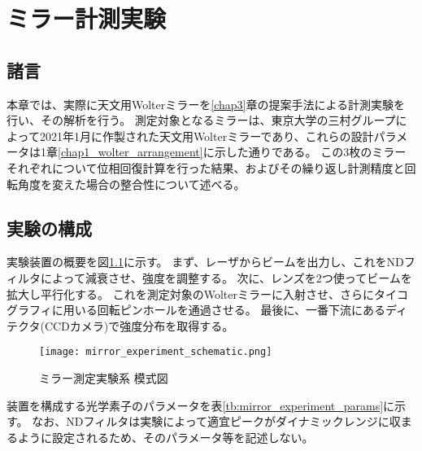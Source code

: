 \chapter{ミラー計測実験}
\thispagestyle{empty}
\label{chap5}
\graphicspath{{chap5/figure/}}
\minitoc

\newpage


\section{諸言}
\label{chap5_introduction}

本章では、実際に天文用Wolterミラーを\ref{chap3}章の提案手法による計測実験を行い、その解析を行う。
測定対象となるミラーは、東京大学の三村グループによって2021年1月に作製された天文用Wolterミラーであり、これらの設計パラメータは1章\ref{chap1_wolter_arrangement}に示した通りである。
この3枚のミラーそれぞれについて位相回復計算を行った結果、およびその繰り返し計測精度と回転角度を変えた場合の整合性について述べる。

\clearpage
\newpage

\section{実験の構成}

実験装置の概要を図\ref{fig:mirror_experiment_schematic}に示す。
まず、レーザからビームを出力し、これをNDフィルタによって減衰させ、強度を調整する。
次に、レンズを2つ使ってビームを拡大し平行化する。
これを測定対象のWolterミラーに入射させ、さらにタイコグラフィに用いる回転ピンホールを通過させる。
最後に、一番下流にあるディテクタ(CCDカメラ)で強度分布を取得する。

\begin{figure}[!ht]
\centering
\texttt{[image: mirror\_experiment\_schematic.png]}
\caption{ミラー測定実験系 模式図}
\label{fig:mirror_experiment_schematic}
\end{figure}

装置を構成する光学素子のパラメータを表\ref{tb:mirror_experiment_params}に示す。
なお、NDフィルタは実験によって適宜ピークがダイナミックレンジに収まるように設定されるため、そのパラメータ等を記述しない。

